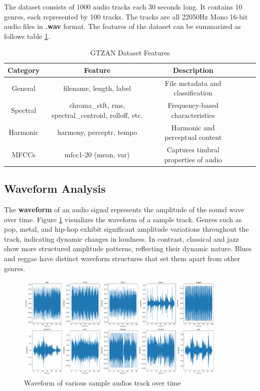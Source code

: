 \documentclass[11.5pt]{article}
\begin{document}
The dataset consists of 1000 audio tracks each 30 seconds long. It contains 10 genres, each represented by 100 tracks. The tracks are all 22050Hz Mono 16-bit audio files in \textbf{.wav} format. The features of the dataset can be summarized as follows table \ref{tab:dataset}.
\begin{table}[h]
    \centering
    \begin{tabular}{cccccc}
        \toprule
        \textbf{Category} & \textbf{Feature}                                     & \textbf{Description}                 \\
        \midrule
        General           & filename, length, label                              & File metadata and classification     \\
        Spectral          & chroma\_stft, rms, spectral\_centroid, rolloff, etc. & Frequency-based characteristics      \\
        Harmonic          & harmony, perceptr, tempo                             & Harmonic and perceptual content      \\

        MFCCs             & mfcc1-20 (mean, var)                                 & Captures timbral properties of audio \\

        \bottomrule
    \end{tabular}
    \caption{GTZAN Dataset Features}
    \label{tab:dataset}
\end{table}

\subsection{Waveform Analysis}
The \textbf{waveform} of an audio signal represents the amplitude of the sound wave over time. Figure \ref{fig:waveform} visualizes the waveform of a sample track. Genres such as pop, metal, and hip-hop exhibit significant amplitude variations throughout the track, indicating dynamic changes in loudness. In contrast, classical and jazz show more structured amplitude patterns, reflecting their dynamic nature. Blues and reggae have distinct waveform structures that set them apart from other genres.
\begin{figure}[H]
    \centering
    \includegraphics[width=0.9\textwidth]{graphics/waveform.pdf}
    \caption{Waveform of various sample audios track over time}
    \label{fig:waveform}
\end{figure}
\end{document}

